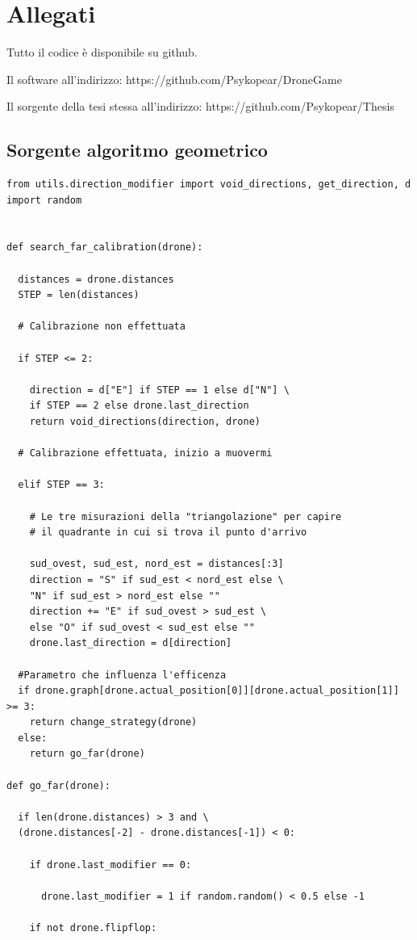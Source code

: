 \chapter{Allegati}
Tutto il codice è disponibile su github.

Il software all'indirizzo: https://github.com/Psykopear/DroneGame

Il sorgente della tesi stessa all'indirizzo: https://github.com/Psykopear/Thesis

\section{Sorgente algoritmo geometrico}
\begin{verbatim}
from utils.direction_modifier import void_directions, get_direction, d
import random


def search_far_calibration(drone):

  distances = drone.distances
  STEP = len(distances)

  # Calibrazione non effettuata

  if STEP <= 2:

    direction = d["E"] if STEP == 1 else d["N"] \
    if STEP == 2 else drone.last_direction
    return void_directions(direction, drone)

  # Calibrazione effettuata, inizio a muovermi

  elif STEP == 3:

    # Le tre misurazioni della "triangolazione" per capire
    # il quadrante in cui si trova il punto d'arrivo

    sud_ovest, sud_est, nord_est = distances[:3]
    direction = "S" if sud_est < nord_est else \
    "N" if sud_est > nord_est else ""
    direction += "E" if sud_ovest > sud_est \
    else "O" if sud_ovest < sud_est else ""
    drone.last_direction = d[direction]

  #Parametro che influenza l'efficenza
  if drone.graph[drone.actual_position[0]][drone.actual_position[1]] >= 3:
    return change_strategy(drone)
  else:
    return go_far(drone)

def go_far(drone):

  if len(drone.distances) > 3 and \
  (drone.distances[-2] - drone.distances[-1]) < 0:

    if drone.last_modifier == 0:

      drone.last_modifier = 1 if random.random() < 0.5 else -1

    if not drone.flipflop:


\end{verbatim}
